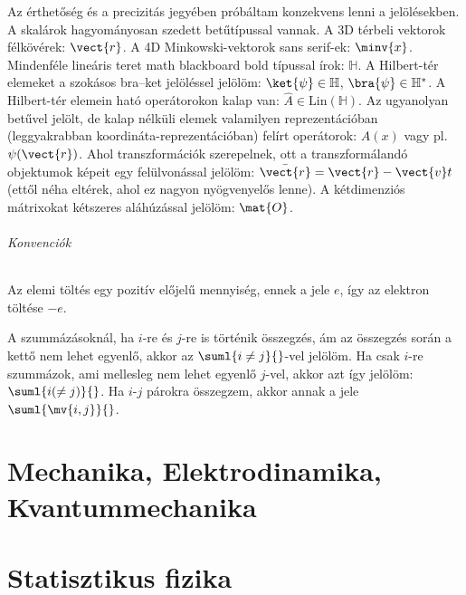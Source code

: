 \documentclass[a4paper,11pt,oneside,titlepage]{book}
\begin{document}
  Az érthetőség és a precizitás jegyében próbáltam konzekvens lenni a jelölésekben. 
  A skalárok hagyományosan szedett betűtípussal vannak. 
  A 3D térbeli vektorok félkövérek: $\vect{r}$. A 4D Minkowski-vektorok sans serif-ek: $\minv{x}$. 
  Mindenféle lineáris teret math blackboard bold típussal írok: $\mathbb{H}$.
  A Hilbert-tér elemeket a szokásos bra--ket jelöléssel jelölöm: $\ket{\psi}\in\mathbb{H}$, $\bra{\psi}\in\mathbb{H}^*$.
  A Hilbert-tér elemein ható operátorokon kalap van: $\hat{A}\in\mathrm{Lin}(\mathbb{H})$.
  Az ugyanolyan betűvel jelölt, de kalap nélküli elemek valamilyen reprezentációban (leggyakrabban koordináta-reprezentációban) felírt operátorok: $A(x)$ vagy pl. $\psi(\vect{r})$.
  Ahol transzformációk szerepelnek, ott a transzformálandó objektumok képeit egy felülvonással jelölöm: $\bar{\vect{r}}=\vect{r}-\vect{v}t$ (ettől néha eltérek, ahol ez nagyon nyögvenyelős lenne).
  A kétdimenziós mátrixokat kétszeres aláhúzással jelölöm: $\mat{O}$.
  
  \paragraph{Konvenciók}
  Az elemi töltés egy pozitív előjelű mennyiség, ennek a jele $e$, így az elektron töltése $-e$. 
  
  A szummázásoknál, ha $i$-re és $j$-re is történik összegzés, ám az összegzés során a kettő nem lehet egyenlő, akkor az $\suml{i\ne j}{}$-vel jelölöm. 
  Ha csak $i$-re szummázok, ami mellesleg nem lehet egyenlő $j$-vel, akkor azt így jelölöm: $\suml{i(\ne j)}{}$. 
  Ha $i$-$j$ párokra összegzem, akkor annak a jele $\suml{\mv{i,j}}{}$.
  
  \setcounter{tocdepth}{0}
  \tableofcontents 
 
 \part{Mechanika, Elektrodinamika, Kvantummechanika}
 
  
  
  
  
  
  
  
  
  
  
  
  
  
  
  
  
  
 \part{Statisztikus fizika}
 
\end{document}
